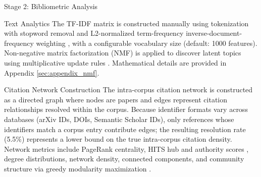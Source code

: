 \documentclass[
  ignorenonframetext,
]{beamer}
\begin{document}
\begin{frame}[fragile]{Stage 2: Bibliometric Analysis
\label{sec:methods_bibliometrics}}
\begin{block}{Text Analytics}
\protect{}\label{text-analytics}
The TF-IDF matrix is constructed manually using tokenization with
stopword removal and L2-normalized term-frequency
inverse-document-frequency weighting \citep{salton1975vector}, with a
configurable vocabulary size (default: 1000 features). Non-negative
matrix factorization (NMF) is applied to discover latent topics using
multiplicative update rules \citep{lee1999nmf}. Mathematical details are
provided in Appendix \ref{sec:appendix_nmf}.
\end{block}

\begin{block}{Citation Network Construction}
\protect{}\label{citation-network-construction}
The intra-corpus citation network is constructed as a directed graph
where nodes are papers and edges represent citation relationships
resolved within the corpus. Because identifier formats vary across
databases (arXiv IDs, DOIs, Semantic Scholar IDs), only references whose
identifiers match a corpus entry contribute edges; the resulting
resolution rate (5.5\%) represents a lower bound on the true
intra-corpus citation density. Network metrics include PageRank
centrality, HITS hub and authority scores
\citep{kleinberg1999authoritative}, degree distributions, network
density, connected components, and community structure via greedy
modularity maximization \citep{clauset2004finding}.
\end{block}
\end{frame}
\end{document}
